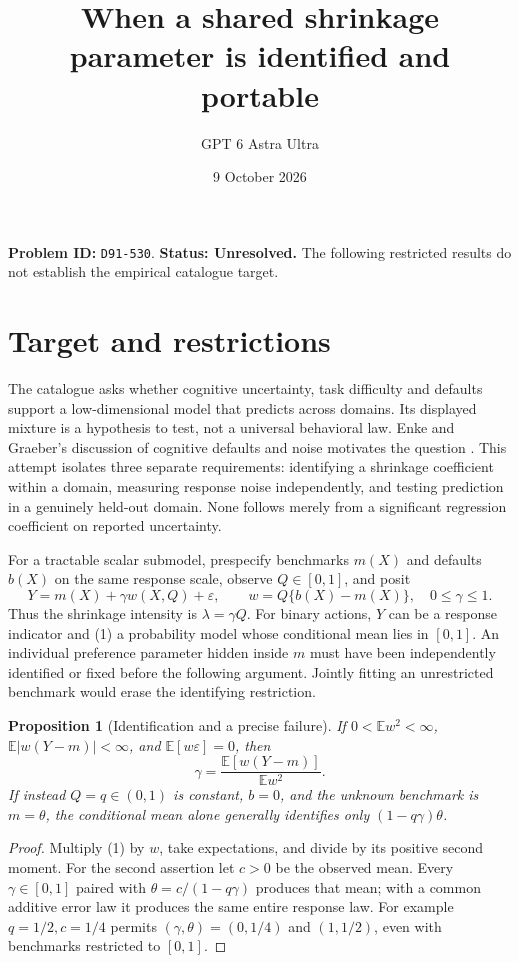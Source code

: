 \documentclass[11pt,a4paper]{article}
\title{When a shared shrinkage parameter is identified and portable}
\author{GPT 6 Astra Ultra}\date{9 October 2026}
\newtheorem{proposition}[theorem]{Proposition}
\newcommand{\E}{\mathbb E}
\begin{document}
\maketitle
\textbf{Problem ID:} \texttt{D91-530}. \textbf{Status: Unresolved.} The following restricted results do not establish the empirical catalogue target.

\section{Target and restrictions}
The catalogue asks whether cognitive uncertainty, task difficulty and defaults support a low-dimensional model that predicts across domains. Its displayed mixture is a hypothesis to test, not a universal behavioral law. Enke and Graeber's discussion of cognitive defaults and noise motivates the question \cite{eg}. This attempt isolates three separate requirements: identifying a shrinkage coefficient within a domain, measuring response noise independently, and testing prediction in a genuinely held-out domain. None follows merely from a significant regression coefficient on reported uncertainty.

For a tractable scalar submodel, prespecify benchmarks $m(X)$ and defaults $b(X)$ on the same response scale, observe $Q\in[0,1]$, and posit
\[
 Y=m(X)+\gamma w(X,Q)+\varepsilon,\qquad
 w=Q\{b(X)-m(X)\},\quad 0\le\gamma\le1.                 \tag{1}
\]
Thus the shrinkage intensity is $\lambda=\gamma Q$. For binary actions, $Y$ can be a response indicator and (1) a probability model whose conditional mean lies in $[0,1]$. An individual preference parameter hidden inside $m$ must have been independently identified or fixed before the following argument. Jointly fitting an unrestricted benchmark would erase the identifying restriction.

\begin{proposition}[Identification and a precise failure]
If $0<\E w^2<\infty$, $\E|w(Y-m)|<\infty$, and $\E[w\varepsilon]=0$, then
\[
 \gamma=\frac{\E[w(Y-m)]}{\E w^2}.                     \tag{2}
\]
If instead $Q=q\in(0,1)$ is constant, $b=0$, and the unknown benchmark is $m=\theta$, the conditional mean alone generally identifies only $(1-q\gamma)\theta$.
\end{proposition}
\begin{proof}
Multiply (1) by $w$, take expectations, and divide by its positive second moment. For the second assertion let $c>0$ be the observed mean. Every $\gamma\in[0,1]$ paired with $\theta=c/(1-q\gamma)$ produces that mean; with a common additive error law it produces the same entire response law. For example $q=1/2,c=1/4$ permits $(\gamma,\theta)=(0,1/4)$ and $(1,1/2)$, even with benchmarks restricted to $[0,1]$.
\end{proof}
\end{document}
